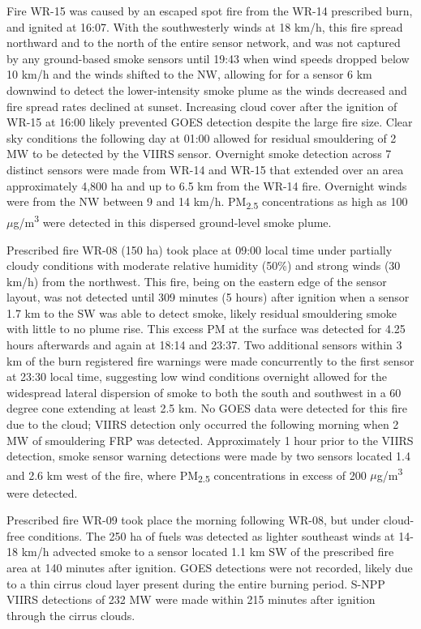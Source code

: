 \documentclass[fire,article,submit,moreauthors]{mdpi}
\begin{document}
Fire WR-15 was caused by an escaped spot fire from the WR-14 prescribed
burn, and ignited at 16:07. With the southwesterly winds at 18 km/h,
this fire spread northward and to the north of the entire sensor
network, and was not captured by any ground-based smoke sensors until
19:43 when wind speeds dropped below 10 km/h and the winds shifted to
the NW, allowing for for a sensor 6 km downwind to detect the
lower-intensity smoke plume as the winds decreased and fire spread rates
declined at sunset. Increasing cloud cover after the ignition of WR-15
at 16:00 likely prevented GOES detection despite the large fire size.
Clear sky conditions the following day at 01:00 allowed for residual
smouldering of 2 MW to be detected by the VIIRS sensor. Overnight smoke
detection across 7 distinct sensors were made from WR-14 and WR-15 that
extended over an area approximately 4,800 ha and up to 6.5 km from the
WR-14 fire. Overnight winds were from the NW between 9 and 14 km/h.
PM\textsubscript{2.5} concentrations as high as 100
\(\mu\)g/m\textsuperscript{3} were detected in this dispersed
ground-level smoke plume.

Prescribed fire WR-08 (150 ha) took place at 09:00 local time under
partially cloudy conditions with moderate relative humidity (50\%) and
strong winds (30 km/h) from the northwest. This fire, being on the
eastern edge of the sensor layout, was not detected until 309 minutes (5
hours) after ignition when a sensor 1.7 km to the SW was able to detect
smoke, likely residual smouldering smoke with little to no plume rise.
This excess PM at the surface was detected for 4.25 hours afterwards and
again at 18:14 and 23:37. Two additional sensors within 3 km of the burn
registered fire warnings were made concurrently to the first sensor at
23:30 local time, suggesting low wind conditions overnight allowed for
the widespread lateral dispersion of smoke to both the south and
southwest in a 60 degree cone extending at least 2.5 km. No GOES data
were detected for this fire due to the cloud; VIIRS detection only
occurred the following morning when 2 MW of smouldering FRP was
detected. Approximately 1 hour prior to the VIIRS detection, smoke
sensor warning detections were made by two sensors located 1.4 and 2.6
km west of the fire, where PM\textsubscript{2.5} concentrations in
excess of 200 \(\mu\)g/m\textsuperscript{3} were detected.

Prescribed fire WR-09 took place the morning following WR-08, but under
cloud-free conditions. The 250 ha of fuels was detected as lighter
southeast winds at 14-18 km/h advected smoke to a sensor located 1.1 km
SW of the prescribed fire area at 140 minutes after ignition. GOES
detections were not recorded, likely due to a thin cirrus cloud layer
present during the entire burning period. S-NPP VIIRS detections of 232
MW were made within 215 minutes after ignition through the cirrus
clouds.
\end{document}
